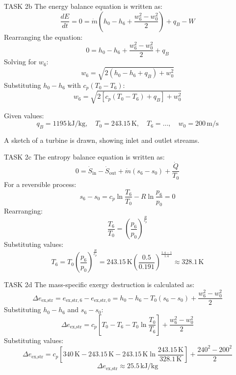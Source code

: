 TASK 2b  
The energy balance equation is written as:  
\[
\frac{dE}{dt} = 0 = \dot{m} \left( h_0 - h_6 + \frac{w_6^2 - w_0^2}{2} \right) + q_B - W
\]  
Rearranging the equation:  
\[
0 = h_0 - h_6 + \frac{w_6^2 - w_0^2}{2} + q_B
\]  
Solving for \( w_6 \):  
\[
w_6 = \sqrt{2 \left( h_0 - h_6 + q_B \right) + w_0^2}
\]  
Substituting \( h_0 - h_6 \) with \( c_p (T_0 - T_6) \):  
\[
w_6 = \sqrt{2 \left[ c_p (T_0 - T_6) + q_B \right] + w_0^2}
\]  

Given values:  
\[
q_B = 1195 \, \text{kJ/kg}, \quad T_0 = 243.15 \, \text{K}, \quad T_6 = \ldots, \quad w_0 = 200 \, \text{m/s}
\]  

A sketch of a turbine is drawn, showing inlet and outlet streams.  

TASK 2c  
The entropy balance equation is written as:  
\[
0 = \dot{S}_{\text{in}} - \dot{S}_{\text{out}} + \dot{m} \left( s_6 - s_0 \right) + \frac{\dot{Q}}{T_0}
\]  
For a reversible process:  
\[
s_6 - s_0 = c_p \ln \frac{T_6}{T_0} - R \ln \frac{p_6}{p_0} = 0
\]  
Rearranging:  
\[
\frac{T_6}{T_0} = \left( \frac{p_6}{p_0} \right)^{\frac{R}{c_p}}
\]  
Substituting values:  
\[
T_6 = T_0 \left( \frac{p_6}{p_0} \right)^{\frac{R}{c_p}} = 243.15 \, \text{K} \left( \frac{0.5}{0.191} \right)^{\frac{1.4 - 1}{1.4}} \approx 328.1 \, \text{K}
\]  

TASK 2d  
The mass-specific exergy destruction is calculated as:  
\[
\Delta e_{\text{ex,str}} = e_{\text{ex,str},6} - e_{\text{ex,str},0} = h_0 - h_6 - T_0 (s_6 - s_0) + \frac{w_6^2 - w_0^2}{2}
\]  
Substituting \( h_0 - h_6 \) and \( s_6 - s_0 \):  
\[
\Delta e_{\text{ex,str}} = c_p \left[ T_0 - T_6 - T_0 \ln \frac{T_0}{T_6} \right] + \frac{w_6^2 - w_0^2}{2}
\]  
Substituting values:  
\[
\Delta e_{\text{ex,str}} = c_p \left[ 340 \, \text{K} - 243.15 \, \text{K} - 243.15 \, \text{K} \ln \frac{243.15 \, \text{K}}{328.1 \, \text{K}} \right] + \frac{240^2 - 200^2}{2}
\]  
\[
\Delta e_{\text{ex,str}} \approx 25.5 \, \text{kJ/kg}
\]